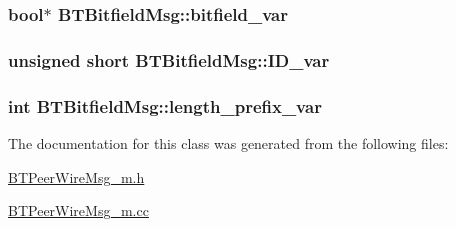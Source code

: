 \subsubsection[{bitfield\+\_\+var}]{\setlength{\rightskip}{0pt plus 5cm}bool$\ast$ B\+T\+Bitfield\+Msg\+::bitfield\+\_\+var\hspace{0.3cm}{\ttfamily [protected]}}\label{classBTBitfieldMsg_aef51fc463d47fdaefb5db5eec449448d}
\hypertarget{classBTBitfieldMsg_a9b73c5b2ce95effc48060f120ac49062}{}
\subsubsection[{I\+D\+\_\+var}]{\setlength{\rightskip}{0pt plus 5cm}unsigned short B\+T\+Bitfield\+Msg\+::\+I\+D\+\_\+var\hspace{0.3cm}{\ttfamily [protected]}}\label{classBTBitfieldMsg_a9b73c5b2ce95effc48060f120ac49062}
\hypertarget{classBTBitfieldMsg_a9040140b874e54a8dc67450a91ffb71b}{}
\subsubsection[{length\+\_\+prefix\+\_\+var}]{\setlength{\rightskip}{0pt plus 5cm}int B\+T\+Bitfield\+Msg\+::length\+\_\+prefix\+\_\+var\hspace{0.3cm}{\ttfamily [protected]}}\label{classBTBitfieldMsg_a9040140b874e54a8dc67450a91ffb71b}


The documentation for this class was generated from the following files\+:\begin{DoxyCompactItemize}
\item 
\hyperlink{BTPeerWireMsg__m_8h}{B\+T\+Peer\+Wire\+Msg\+\_\+m.\+h}\item 
\hyperlink{BTPeerWireMsg__m_8cc}{B\+T\+Peer\+Wire\+Msg\+\_\+m.\+cc}\end{DoxyCompactItemize}

